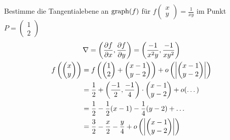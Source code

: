 \begin{bsp}
	Bestimme die Tangentialebene an $\operatorname{graph}(f)$ für $f\begin{pmatrix} x \\ y \end{pmatrix} = \frac{1}{xy}$ im Punkt $P = \begin{pmatrix} 1 \\ 2 \end{pmatrix}$
	\begin{gather*}
		\nabla = \left( \frac{\partial f}{\partial x} , \frac{\partial f}{\partial y} \right) = \left( \frac{-1}{x^2y} , \frac{-1}{xy^2} \right) \\
		\begin{split}
			f\left(\begin{pmatrix} x \\ y \end{pmatrix} \right)
				&= f\left( \begin{pmatrix} 1 \\ 2 \end{pmatrix} + \begin{pmatrix} x-1 \\ y-2 \end{pmatrix} \right) + o\left( \abs{\begin{pmatrix} x-1 \\ y-2 \end{pmatrix}} \right) \\
				&= \frac{1}{2} + \left( \frac{-1}{2} , \frac{-1}{4} \right) \cdot \begin{pmatrix} x-1 \\ y-2 \end{pmatrix} + o(\dots) \\
				&= \frac{1}{2} - \frac{1}{2}(x-1) - \frac{1}{4}(y-2) + \dots \\
				&= \frac{3}{2} - \frac{x}{2} - \frac{y}{4} + o\left( \abs{\begin{pmatrix} x-1 \\ y-2 \end{pmatrix}} \right)
		\end{split}
	\end{gather*}
\end{bsp}
